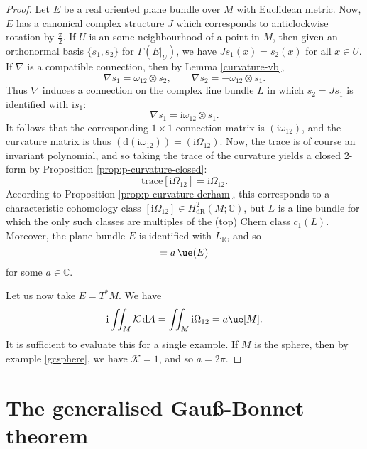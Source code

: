 \documentclass[a4paper,openany]{scrbook}
\newcommand{\ud}{\mathrm{d}}
\newcommand{\ui}{\mathrm{i}}
\begin{document}
\begin{proof}
Let $E$ be a real oriented plane bundle over $M$ with Euclidean metric. Now, $E$ has a canonical complex structure $J$ which corresponds to anticlockwise rotation by  $\frac{\pi}{2}$.  If $U$ is an some neighbourhood of a point in $M$, then given an orthonormal basis $\{s_1,s_2\}$ for $\Gamma(E|_U)$, we have $Js_1(x)=s_2(x)$ for all $x\in U$. If $\nabla$ is a compatible connection, then by Lemma \ref{curvature-vb},
\begin{equation*}
\nabla s_1=\omega_{12}\otimes s_2,\qquad\nabla s_2=-\omega_{12}\otimes s_1.
\end{equation*}
Thus $\nabla$ induces a connection on the complex line bundle $L$ in which $s_2=Js_1$ is identified with $\ui s_1$:
\begin{equation*}
\nabla s_1=\ui\omega_{12}\otimes s_1.
\end{equation*}
It follows that the corresponding $1\times1$ connection matrix is $(\ui\omega_{12})$, and the curvature matrix is thus $(\ud(\ui\omega_{12}))=(\ui\Omega_{12})$. Now, the trace is of course an invariant polynomial, and so taking the trace of the curvature yields a closed 2-form by Proposition \ref{prop:p-curvature-closed}:
\begin{equation*}
\text{trace}[\ui\Omega_{12}]=\ui\Omega_{12}.
\end{equation*}
According to Proposition \ref{prop:p-curvature-derham}, this corresponds to a characteristic cohomology class $[\ui\Omega_{12}]\in H_\text{dR}^2(M;\mathbb{C})$, but $L$ is a line bundle for which the only such classes are multiples of the (top) Chern class $c_1(L)$. Moreover, the plane bundle $E$ is identified with $L_\mathbb{R}$, and so
\begin{equation*}
[\ui\Omega_{12}]=a\,\ue(E)
\end{equation*}
for some $a\in\mathbb{C}$.

Let us now take $E=T^*M$. We have
\begin{equation*}
\ui\iint_M\mathcal{K}\,\ud A=\iint_M\ui\Omega_{12}=a\ue[M].
\end{equation*}
It is sufficient to evaluate this for a single example. If $M$ is the sphere, then by example \eqref{gcsphere}, we have $\mathcal{K}=1$, and so $a=2\pi$.
\end{proof}


\section{The generalised Gauß-Bonnet theorem}
\end{document}
